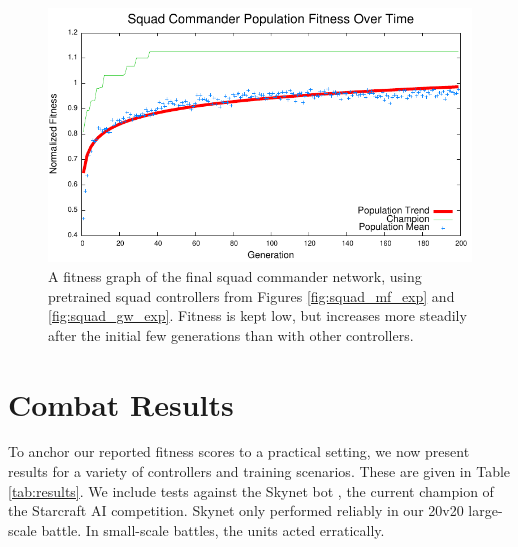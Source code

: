 \documentclass[10pt,a4paper,twocolumn]{article}
\begin{document}
\begin{figure}
\centering
\includegraphics[scale=.59]{plots/squadcommand.pdf}
\caption{A fitness graph of the final squad commander network, using pretrained squad controllers from Figures \ref{fig:squad_mf_exp} and \ref{fig:squad_gw_exp}. Fitness is kept low, but increases more steadily after the initial few generations than with other controllers.}
\label{fig:squadcommand_exp}
\end{figure}

\section{Combat Results}

To anchor our reported fitness scores to a practical setting, we now present results for a variety of controllers and training scenarios. These are given in Table \ref{tab:results}. We include tests against the Skynet bot \cite{skynet}, the current champion of the Starcraft AI competition. Skynet only performed reliably in our 20v20 large-scale battle. In small-scale battles, the units acted erratically.
\end{document}
